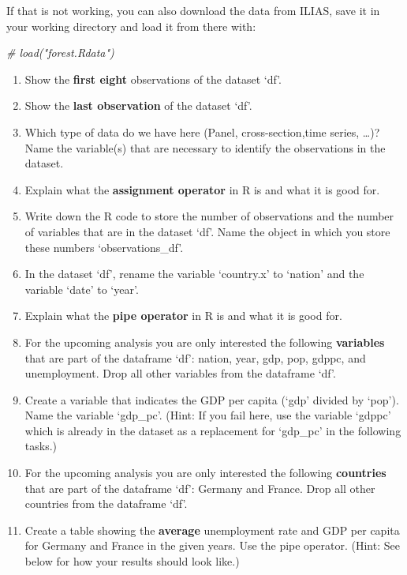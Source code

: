 \documentclass[
  12pt,
  oneside]{book}
\newenvironment{Shaded}{\begin{snugshade}}{\end{snugshade}}
\newcommand{\CommentTok}[1]{\textcolor[rgb]{0.56,0.35,0.01}{\textit{#1}}}
\theoremstyle{definition}
\theoremstyle{definition}
\theoremstyle{definition}
\theoremstyle{definition}
\theoremstyle{remark}
\begin{document}
If that is not working, you can also download the data from ILIAS, save it in
your working directory and load it from there with:

\begin{Shaded}
\begin{Highlighting}[]
\CommentTok{\# load("forest.Rdata")}
\end{Highlighting}
\end{Shaded}

\begin{enumerate}
\def\labelenumi{(\arabic{enumi})}
\setcounter{enumi}{4}
\item
  Show the \textbf{first eight} observations of the dataset `df'.
\item
  Show the \textbf{last observation} of the dataset `df'.
\item
  Which type of data do we have here (Panel, cross-section,time series, \ldots)?
  Name the variable(s) that are necessary to identify the observations in the dataset.
\item
  Explain what the \textbf{assignment operator} in R is and what it is good for.
\item
  Write down the R code to store the number of observations and the number of variables
  that are in the dataset `df'. Name the object in which you store these numbers `observations\_df'.
\item
  In the dataset `df', rename the variable `country.x' to `nation' and the variable `date' to `year'.
\item
  Explain what the \textbf{pipe operator} in R is and what it is good for.
\item
  For the upcoming analysis you are only interested the following \textbf{variables} that are part of the dataframe `df': nation, year, gdp, pop, gdppc, and unemployment. Drop all other variables from the dataframe `df'.
\item
  Create a variable that indicates the GDP per capita (`gdp' divided by `pop').
  Name the variable `gdp\_pc'. (Hint: If you fail here, use the variable `gdppc' which is
  already in the dataset as a replacement for `gdp\_pc' in the following tasks.)
\item
  For the upcoming analysis you are only interested the following \textbf{countries}
  that are part of the dataframe `df': Germany and France. Drop all other
  countries from the dataframe `df'.
\item
  Create a table showing the \textbf{average} unemployment rate and GDP per capita for Germany
  and France in the given years. Use the pipe operator. (Hint: See below for how your results should
  look like.)
\end{enumerate}
\end{document}
